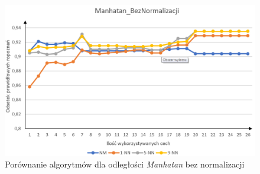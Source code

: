 \documentclass[12pt]{article}
\begin{document}
\begin{figure}[H]
	\centering
		\includegraphics[scale=0.66]{images/algorithms/manhatan_beznorm.png}
	\caption{Porównanie algorytmów dla odległości \textit{Manhatan} bez normalizacji}
	\label{algorytmy_manhatan_bnorm_wyk}
\end{figure}


\end{document}
